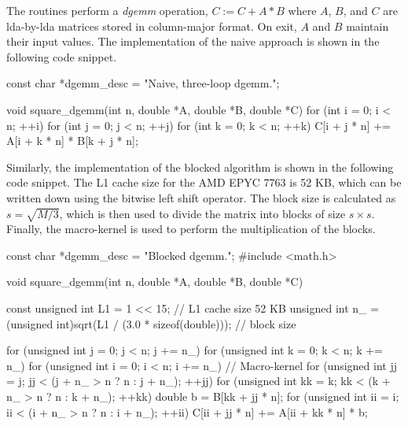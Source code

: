 \documentclass[unicode,11pt,a4paper,oneside,numbers=endperiod,openany]{scrartcl}
\begin{document}
The routines perform a \textit{dgemm} operation, $C := C + A * B$
where $A$, $B$, and $C$ are lda-by-lda matrices stored in column-major format.
On exit, $A$ and $B$ maintain their input values. The implementation of the naive approach is shown in the following code snippet.
\begin{cppverbatim}
const char *dgemm_desc = "Naive, three-loop dgemm.";

void square_dgemm(int n, double *A, double *B, double *C)
{
  for (int i = 0; i < n; ++i)
  {
    for (int j = 0; j < n; ++j)
    {
      for (int k = 0; k < n; ++k)
      {
        C[i + j * n] += A[i + k * n] * B[k + j * n];
      }
    }
  }
}

\end{cppverbatim}
Similarly, the implementation of the blocked algorithm is shown in the following code snippet.
The L1 cache size for the AMD EPYC 7763 is 52 KB, which can be written down using the bitwise
left shift operator. The block size is calculated as $s = \sqrt{M/ 3}$, which is then
used to divide the matrix into blocks of size $s \times s$. Finally, the macro-kernel
is used to perform the multiplication of the blocks.
\begin{cppverbatim}
const char *dgemm_desc = "Blocked dgemm.";
#include <math.h>

void square_dgemm(int n, double *A, double *B, double *C)
{
  const unsigned int L1 = 1 << 15;                                   // L1 cache size 52 KB
  unsigned int n_ = (unsigned int)sqrt(L1 / (3.0 * sizeof(double))); // block size

  for (unsigned int j = 0; j < n; j += n_)
  {
    for (unsigned int k = 0; k < n; k += n_)
    {
      for (unsigned int i = 0; i < n; i += n_)
      {
        // Macro-kernel
        for (unsigned int jj = j; jj < (j + n_ > n ? n : j + n_); ++jj)
        {
          for (unsigned int kk = k; kk < (k + n_ > n ? n : k + n_); ++kk)
          {
            double b = B[kk + jj * n];
            for (unsigned int ii = i; ii < (i + n_ > n ? n : i + n_); ++ii)
            {
              C[ii + jj * n] += A[ii + kk * n] * b;
            }
          }
        }
      }
    }
  }
}

\end{cppverbatim}
\end{document}
